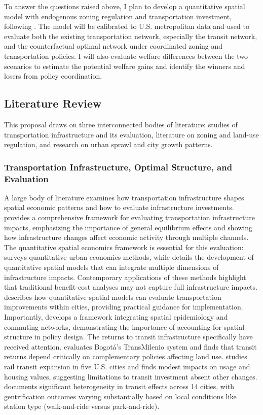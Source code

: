 \documentclass[12pt, a4paper]{article}
\begin{document}
To answer the questions raised above, I plan to develop a quantitative spatial model with endogenous zoning regulation and transportation investment, following \cite{Fajgelbaum2020-yv}. The model will be calibrated to U.S. metropolitan data and used to evaluate both the existing transportation network, especially the transit network, and the counterfactual optimal network under coordinated zoning and transportation policies. I will also evaluate welfare differences between the two scenarios to estimate the potential welfare gains and identify the winners and losers from policy coordination.



\subsection{Literature Review}

This proposal draws on three interconnected bodies of literature: studies of transportation infrastructure and its evaluation, literature on zoning and land-use regulation, and research on urban sprawl and city growth patterns.

\subsubsection{Transportation Infrastructure, Optimal Structure, and Evaluation}

A large body of literature examines how transportation infrastructure shapes spatial economic patterns and how to evaluate infrastructure investments. \citet{Donaldson2025-wa} provides a comprehensive framework for evaluating transportation infrastructure impacts, emphasizing the importance of general equilibrium effects and showing how infrastructure changes affect economic activity through multiple channels. The quantitative spatial economics framework is essential for this evaluation: \citet{Redding2025-fr} surveys quantitative urban economics methods, while \citet{Redding2017-nf} details the development of quantitative spatial models that can integrate multiple dimensions of infrastructure impacts. Contemporary applications of these methods highlight that traditional benefit-cost analyses may not capture full infrastructure impacts. \citet{Severen2026-qx} describes how quantitative spatial models can evaluate transportation improvements within cities, providing practical guidance for implementation. Importantly, \citet{Fajgelbaum2021-fx} develops a framework integrating spatial epidemiology and commuting networks, demonstrating the importance of accounting for spatial structure in policy design. The returns to transit infrastructure specifically have received attention. \citet{Tsivanidis2023-hs} evaluates Bogotá's TransMilenio system and finds that transit returns depend critically on complementary policies affecting land use. \citet{Baum-Snow2000-xl} studies rail transit expansion in five U.S. cities and finds modest impacts on usage and housing values, suggesting limitations to transit investment absent other changes. \citet{Kahn2007-xc} documents significant heterogeneity in transit effects across 14 cities, with gentrification outcomes varying substantially based on local conditions like station type (walk-and-ride versus park-and-ride).
\end{document}
